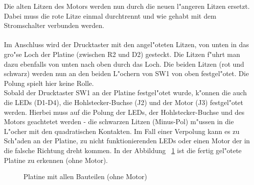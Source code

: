 Die alten Litzen des Motors werden nun durch die neuen l"angeren Litzen ersetzt. Dabei muss die rote Litze einmal durchtrennt und wie gehabt mit dem Stromschalter verbunden werden. \\
\\
Im Anschluss wird der Drucktaster mit den angel"oteten Litzen, von unten in das gro"se Loch der Platine (zwischen R2 und D2) gesteckt. Die Litzen f"uhrt man dazu ebenfalls von unten nach oben durch das Loch.
Die beiden Litzen (rot und schwarz) werden nun an den beiden L"ochern von SW1 von oben festgel"otet. Die Polung spielt hier keine Rolle.\\
Sobald der Drucktaster SW1 an der Platine festgel"otet wurde, k"onnen die auch die LEDs (D1-D4), die Hohlstecker-Buchse (J2) und der Motor (J3) festgel"otet werden. Hierbei muss auf die Polung der LEDs, der Hohlstecker-Buchse und des Motors geachtetet werden - die schwarzen Litzen (Minus-Pol) m"ussen in die L"ocher mit den quadratischen Kontakten. Im Fall einer Verpolung kann es zu Sch"aden an der Platine, zu nicht funktionierenden LEDs oder einen Motor der in die falsche Richtung dreht kommen.
In der Abbildung ~\ref{fig22} ist die fertig gel"otete Platine zu erkennen (ohne Motor).

\vspace{1cm}
\begin{figure}[!ht]
	\centering
	\caption{Platine mit allen Bauteilen (ohne Motor)}
	\label{fig22}
\end{figure}
\vspace{0.5cm}

